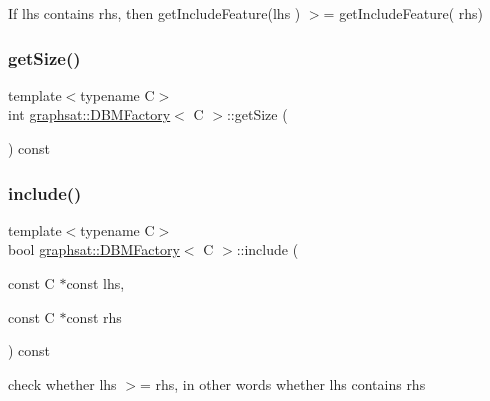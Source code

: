If lhs contains rhs, then get\+Include\+Feature(lhs ) $>$= get\+Include\+Feature( rhs) \mbox{\label{classgraphsat_1_1_d_b_m_factory_aaecf26c5b4157fce85102a8759d9c435}} 
\subsubsection{\texorpdfstring{getSize()}{getSize()}}
{\footnotesize\ttfamily template$<$typename C$>$ \\
int \mbox{\hyperlink{classgraphsat_1_1_d_b_m_factory}{graphsat\+::\+D\+B\+M\+Factory}}$<$ C $>$\+::get\+Size (\begin{DoxyParamCaption}{ }\end{DoxyParamCaption}) const\hspace{0.3cm}{\ttfamily [inline]}}

\mbox{\label{classgraphsat_1_1_d_b_m_factory_a449e577089eb65bafab1fdfb40540da5}} 
\subsubsection{\texorpdfstring{include()}{include()}}
{\footnotesize\ttfamily template$<$typename C$>$ \\
bool \mbox{\hyperlink{classgraphsat_1_1_d_b_m_factory}{graphsat\+::\+D\+B\+M\+Factory}}$<$ C $>$\+::include (\begin{DoxyParamCaption}\item[{const C $\ast$const}]{lhs,  }\item[{const C $\ast$const}]{rhs }\end{DoxyParamCaption}) const\hspace{0.3cm}{\ttfamily [inline]}}



check whether lhs $>$= rhs, in other words whether lhs contains rhs 

